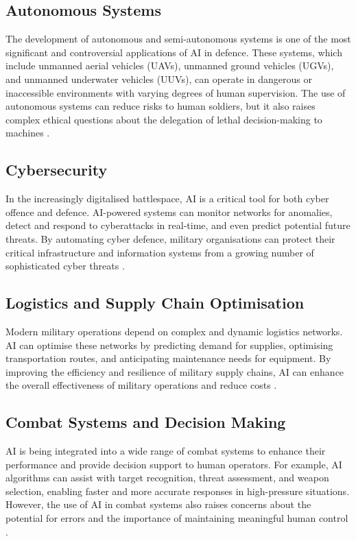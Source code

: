 \subsection{Autonomous Systems}

The development of autonomous and semi-autonomous systems is one of the most significant and controversial applications of AI in defence. These systems, which include unmanned aerial vehicles (UAVs), unmanned ground vehicles (UGVs), and unmanned underwater vehicles (UUVs), can operate in dangerous or inaccessible environments with varying degrees of human supervision. The use of autonomous systems can reduce risks to human soldiers, but it also raises complex ethical questions about the delegation of lethal decision-making to machines \parencite{dignum2019responsible}.

\subsection{Cybersecurity}

In the increasingly digitalised battlespace, AI is a critical tool for both cyber offence and defence. AI-powered systems can monitor networks for anomalies, detect and respond to cyberattacks in real-time, and even predict potential future threats. By automating cyber defence, military organisations can protect their critical infrastructure and information systems from a growing number of sophisticated cyber threats \parencite{sayler2020artificial}.

\subsection{Logistics and Supply Chain Optimisation}

Modern military operations depend on complex and dynamic logistics networks. AI can optimise these networks by predicting demand for supplies, optimising transportation routes, and anticipating maintenance needs for equipment. By improving the efficiency and resilience of military supply chains, AI can enhance the overall effectiveness of military operations and reduce costs \parencite{sayler2020artificial}.

\subsection{Combat Systems and Decision Making}

AI is being integrated into a wide range of combat systems to enhance their performance and provide decision support to human operators. For example, AI algorithms can assist with target recognition, threat assessment, and weapon selection, enabling faster and more accurate responses in high-pressure situations. However, the use of AI in combat systems also raises concerns about the potential for errors and the importance of maintaining meaningful human control \parencite{dignum2019responsible}.

